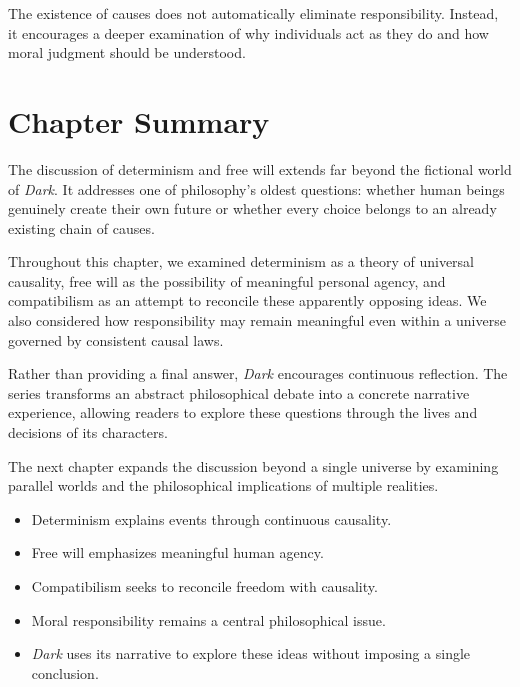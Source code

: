 \documentclass[12pt,oneside,openany]{book}
\begin{document}
\begin{tcolorbox}[colback=purple!6,colframe=purple!60!black,title=Critical Reflection]
The existence of causes does not automatically eliminate responsibility.
Instead, it encourages a deeper examination of why individuals act as they do
and how moral judgment should be understood.
\end{tcolorbox}

\section{Chapter Summary}

The discussion of determinism and free will extends far beyond the fictional
world of \textit{Dark}. It addresses one of philosophy's oldest questions:
whether human beings genuinely create their own future or whether every choice
belongs to an already existing chain of causes.

Throughout this chapter, we examined determinism as a theory of universal
causality, free will as the possibility of meaningful personal agency, and
compatibilism as an attempt to reconcile these apparently opposing ideas. We
also considered how responsibility may remain meaningful even within a universe
governed by consistent causal laws.

Rather than providing a final answer, \textit{Dark} encourages continuous
reflection. The series transforms an abstract philosophical debate into a
concrete narrative experience, allowing readers to explore these questions
through the lives and decisions of its characters.

The next chapter expands the discussion beyond a single universe by examining
parallel worlds and the philosophical implications of multiple realities.

\begin{tcolorbox}[colback=orange!8,colframe=orange!70!black,title=Chapter Takeaways]
\begin{itemize}
\item Determinism explains events through continuous causality.
\item Free will emphasizes meaningful human agency.
\item Compatibilism seeks to reconcile freedom with causality.
\item Moral responsibility remains a central philosophical issue.
\item \textit{Dark} uses its narrative to explore these ideas without imposing a single conclusion.
\end{itemize}
\end{tcolorbox}
\end{document}
